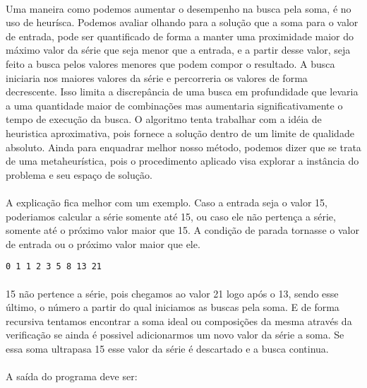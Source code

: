 \documentclass[10pt,a4paper]{article}
\begin{document}
{{	\paragraph{}Uma maneira como podemos aumentar o desempenho na busca
	pela soma, é no uso de heurísca. Podemos avaliar olhando 
	para a solução que a soma para o valor de entrada, pode ser quantificado
	de forma a manter uma proximidade maior do máximo valor da série que seja menor
	que a entrada, e a partir desse valor, seja feito a busca pelos valores
	menores que podem compor o resultado. A busca iniciaria nos maiores valores
	da série e percorreria os valores de forma decrescente.
	Isso limita a discrepância de uma busca	em profundidade que levaria 
	a uma quantidade maior de combinações mas aumentaria significativamente
	o tempo de execução da busca. O algoritmo tenta trabalhar 
	com a idéia de heuristica aproximativa, pois fornece a solução
	dentro de um limite de qualidade absoluto. 
	Ainda para enquadrar melhor nosso método, podemos
	dizer que se trata de uma metaheurística, pois o procedimento aplicado
	visa explorar a instância do problema e seu espaço de solução.

\newpage

	\paragraph{} A explicação fica melhor com um exemplo. Caso a entrada
	seja o valor 15, poderiamos calcular a série somente até 15, ou caso
	ele não pertença a série, somente até o próximo valor maior que 15.
	A condição de parada tornasse o valor de entrada ou o próximo valor
	maior que ele.
	
	\begin{Verbatim}[frame=single,
				framesep=3mm,
				xrightmargin=7cm]
  0 1 1 2 3 5 8 13 21
\end{Verbatim}

	\paragraph{} 15 não pertence a série, pois chegamos ao valor 21
	logo após o 13, sendo esse último, o número a partir do qual iniciamos
	as buscas pela soma. E de forma recursiva tentamos encontrar a soma ideal
	ou composições da mesma através da verificação se ainda é possivel adicionarmos
	um novo valor da série a soma. Se essa soma ultrapasa 15 esse valor da série
	é descartado e a busca continua.


{\raggedright{}
	\paragraph{}A saída do programa deve ser:

}}}
\end{document}
